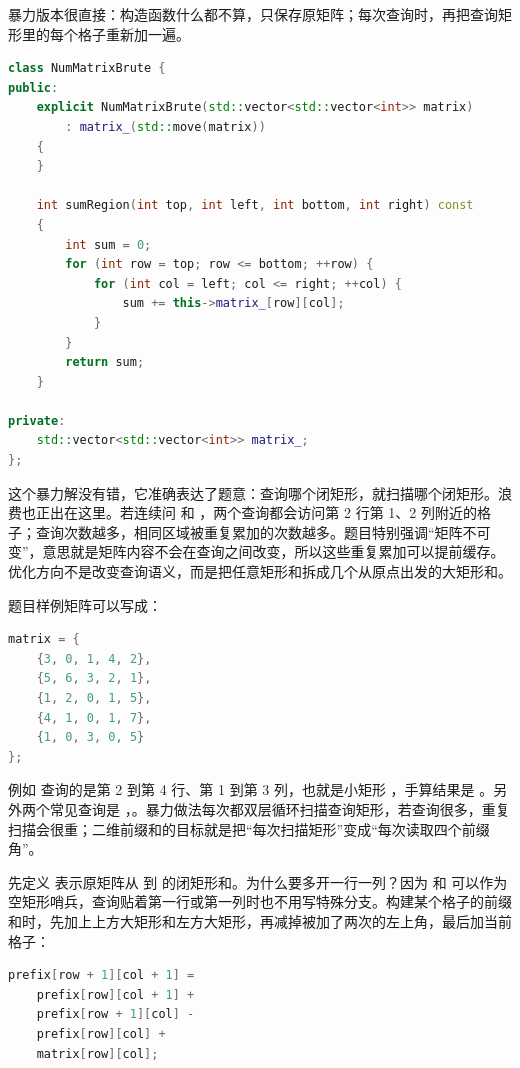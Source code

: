 暴力版本很直接：构造函数什么都不算，只保存原矩阵；每次查询时，再把查询矩形里的每个格子重新加一遍。

\begin{lstlisting}[language=C++,caption={LeetCode 304 二维区域和检索：每次查询暴力扫描}]
class NumMatrixBrute {
public:
    explicit NumMatrixBrute(std::vector<std::vector<int>> matrix)
        : matrix_(std::move(matrix))
    {
    }

    int sumRegion(int top, int left, int bottom, int right) const
    {
        int sum = 0;
        for (int row = top; row <= bottom; ++row) {
            for (int col = left; col <= right; ++col) {
                sum += this->matrix_[row][col];
            }
        }
        return sum;
    }

private:
    std::vector<std::vector<int>> matrix_;
};
\end{lstlisting}

这个暴力解没有错，它准确表达了题意：查询哪个闭矩形，就扫描哪个闭矩形。浪费也正出在这里。若连续问  和 ，两个查询都会访问第 2 行第 1、2 列附近的格子；查询次数越多，相同区域被重复累加的次数越多。题目特别强调“矩阵不可变”，意思就是矩阵内容不会在查询之间改变，所以这些重复累加可以提前缓存。优化方向不是改变查询语义，而是把任意矩形和拆成几个从原点出发的大矩形和。

题目样例矩阵可以写成：
\begin{lstlisting}[language=C++,caption={LeetCode 304 的样例矩阵}]
matrix = {
    {3, 0, 1, 4, 2},
    {5, 6, 3, 2, 1},
    {1, 2, 0, 1, 5},
    {4, 1, 0, 1, 7},
    {1, 0, 3, 0, 5}
};
\end{lstlisting}

例如  查询的是第 2 到第 4 行、第 1 到第 3 列，也就是小矩形
，手算结果是 。另外两个常见查询是 ，。暴力做法每次都双层循环扫描查询矩形，若查询很多，重复扫描会很重；二维前缀和的目标就是把“每次扫描矩形”变成“每次读取四个前缀角”。

先定义  表示原矩阵从  到  的闭矩形和。为什么要多开一行一列？因为  和  可以作为空矩形哨兵，查询贴着第一行或第一列时也不用写特殊分支。构建某个格子的前缀和时，先加上上方大矩形和左方大矩形，再减掉被加了两次的左上角，最后加当前格子：

\begin{lstlisting}[language=C++,caption={LeetCode 304：构建二维前缀和的单格转移}]
prefix[row + 1][col + 1] =
    prefix[row][col + 1] +
    prefix[row + 1][col] -
    prefix[row][col] +
    matrix[row][col];
\end{lstlisting}

